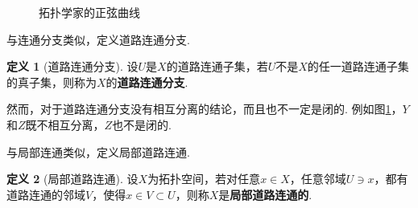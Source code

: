 \documentclass[12pt]{ctexart}
\theoremstyle{definition}
\newtheorem{definition}{定义}
\theoremstyle{plain}
\begin{document}
	\begin{figure}[htbp]
		\centering
	
	\caption{拓扑学家的正弦曲线}
	\label{sin}
	\end{figure}
	与连通分支类似，定义道路连通分支.
	\begin{definition}[道路连通分支]
		设$U$是$X$的道路连通子集，若$U$不是$X$的任一道路连通子集的真子集，则称为$X$的\textbf{道路连通分支}.
	\end{definition}
	然而，对于道路连通分支没有相互分离的结论，而且也不一定是闭的. 例如图\ref{sin}，$Y$和$Z$既不相互分离，$Z$也不是闭的.
	
	与局部连通类似，定义局部道路连通.
	\begin{definition}[局部道路连通]
		设$X$为拓扑空间，若对任意$x\in X$，任意邻域$U\ni x$，都有道路连通的邻域$V$，使得$x\in V\subset U$，则称$X$是\textbf{局部道路连通的}.
	\end{definition}
\end{document}
